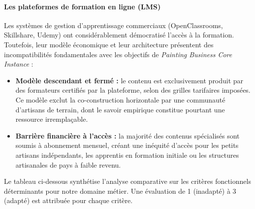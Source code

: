 \documentclass[12pt,a4paper]{report}
\begin{document}
\paragraph{Les plateformes de formation en ligne (LMS)}

\noindent
Les systèmes de gestion d'apprentissage commerciaux (OpenClassrooms, Skillshare, Udemy) ont considérablement démocratisé l'accès à la formation. Toutefois, leur modèle économique et leur architecture présentent des incompatibilités fondamentales avec les objectifs de \textit{Painting Business Core Instance} :

\begin{itemize}[leftmargin=1.5cm, itemsep=4pt]
    \item \textbf{Modèle descendant et fermé :} le contenu est exclusivement produit par des formateurs certifiés par la plateforme, selon des grilles tarifaires imposées. Ce modèle exclut la co-construction horizontale par une communauté d'artisans de terrain, dont le savoir empirique constitue pourtant une ressource irremplaçable.
    \item \textbf{Barrière financière à l'accès :} la majorité des contenus spécialisés sont soumis à abonnement mensuel, créant une inéquité d'accès pour les petits artisans indépendants, les apprentis en formation initiale ou les structures artisanales de pays à faible revenu.
\end{itemize}

\vspace{0.8em}
\begin{insightbox}
Le tableau ci-dessous synthétise l'analyse comparative sur les critères fonctionnels déterminants pour notre domaine métier. Une évaluation de 1 (inadapté) à 3 (adapté) est attribuée pour chaque critère.
\end{insightbox}
\end{document}
